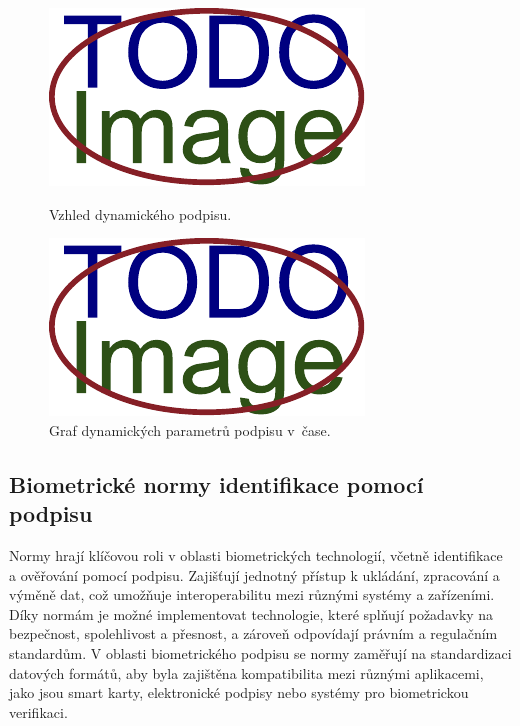 \begin{figure}[h]
  \centering
  \begin{minipage}{0.45\textwidth}
      \centering
      \includegraphics[width=\textwidth]{obrazky-figures/placeholder.pdf}
      \caption{Vzhled dynamického podpisu.}
      \label{fig:first-image}
  \end{minipage}\hfill
  \begin{minipage}{0.45\textwidth}
      \centering
      \includegraphics[width=\textwidth]{obrazky-figures/placeholder.pdf}
      \caption{Graf dynamických parametrů podpisu v~čase.}
      \label{fig:second-image}
  \end{minipage}
\end{figure}

\subsection{Biometrické normy identifikace pomocí podpisu}
Normy hrají klíčovou roli v oblasti biometrických technologií, včetně identifikace a ověřování pomocí podpisu. %
Zajišťují jednotný přístup k ukládání, zpracování a výměně dat, což umožňuje interoperabilitu mezi různými systémy a zařízeními. %
Díky normám je možné implementovat technologie, které splňují požadavky na bezpečnost, spolehlivost a přesnost, a zároveň odpovídají právním a regulačním standardům. %
V oblasti biometrického podpisu se normy zaměřují na standardizaci datových formátů, aby byla zajištěna kompatibilita mezi různými aplikacemi, jako jsou smart karty, elektronické podpisy nebo systémy pro biometrickou verifikaci. %

